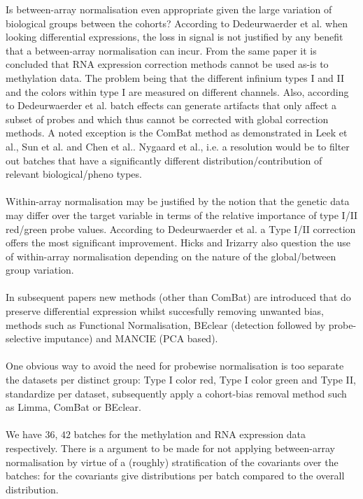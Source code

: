 \documentclass[a4paper,10pt]{article}
\begin{document}
Is between-array normalisation even appropriate given the large variation of biological groups between the cohorts?
According to Dedeurwaerder et al.\cite{Dedeurwaerder2014} when looking differential expressions, the loss in signal is not justified by any benefit that a between-array normalisation can incur. From the same paper it is concluded
that RNA expression correction methods cannot be used as-is to methylation data. The problem being that the different infinium types I and II and the colors within type I are measured on different channels. Also, according to Dedeurwaerder et al. batch effects can generate artifacts that only affect a subset of probes and which thus cannot be corrected with global correction methods. A noted exception is the ComBat\cite{Johnson2007} method as demonstrated in Leek et al.\cite{Leek2010}, Sun et al.\cite{Sun2011} and
Chen et al.\cite{Chen2011}. Nygaard et al.\cite{Nygaard2015}, i.e. a resolution would be to filter out batches that have a significantly different distribution/contribution of relevant biological/pheno types.
\\ \\
%
Within-array normalisation may be justified by the notion that the genetic data may differ over the target variable in terms of the relative importance of type I/II red/green probe values. According to Dedeurwaerder et al.\cite{Dedeurwaerder2014} a Type I/II correction offers the most significant improvement. Hicks and Irizarry\cite{Hicks2014} also question the use of within-array normalisation depending on the nature of the global/between group variation.\\ \\
%
In subsequent papers new methods (other than ComBat) are introduced that do preserve differential expression whilst succesfully removing unwanted bias, methods such as Functional Normalisation, BEclear (detection followed by probe-selective imputance) 
and MANCIE (PCA based).  \\ \\
%
One obvious way to avoid the need for probewise normalisation is too separate the datasets per distinct group:
Type I color red, Type I color green and Type II, standardize per dataset, subsequently apply a cohort-bias removal method such as Limma, ComBat or BEclear. \\ \\
%
We have $36$, $42$  batches for the methylation and RNA expression data respectively. There is a argument to be made for not applying between-array normalisation by virtue of a (roughly) stratification of the covariants over the batches: for the covariants give distributions per batch compared to the overall distribution.
\end{document}
